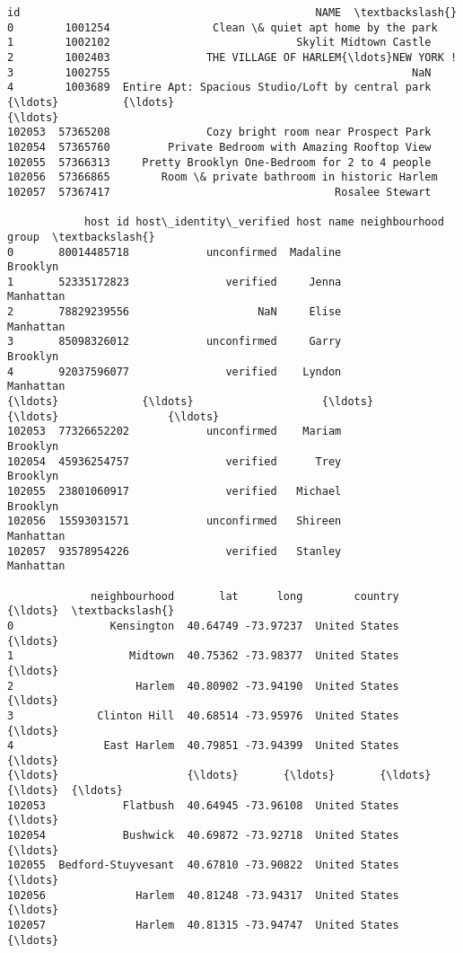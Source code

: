 \documentclass[11pt]{article}
\makeatletter
\newcommand{\boxspacing}{\kern\kvtcb@left@rule\kern\kvtcb@boxsep}
\newcommand{\prompt}[4]{
        {\ttfamily\llap{{\color{#2}[#3]:\hspace{3pt}#4}}\vspace{-\baselineskip}}
    }
\makeatother
\begin{document}
            \begin{tcolorbox}[breakable, size=fbox, boxrule=.5pt, pad at break*=1mm, opacityfill=0]
\prompt{Out}{outcolor}{ }{\boxspacing}
\begin{Verbatim}[commandchars=\\\{\}]
              id                                              NAME  \textbackslash{}
0        1001254                Clean \& quiet apt home by the park
1        1002102                             Skylit Midtown Castle
2        1002403               THE VILLAGE OF HARLEM{\ldots}NEW YORK !
3        1002755                                               NaN
4        1003689  Entire Apt: Spacious Studio/Loft by central park
{\ldots}          {\ldots}                                               {\ldots}
102053  57365208               Cozy bright room near Prospect Park
102054  57365760         Private Bedroom with Amazing Rooftop View
102055  57366313     Pretty Brooklyn One-Bedroom for 2 to 4 people
102056  57366865        Room \& private bathroom in historic Harlem
102057  57367417                                   Rosalee Stewart

            host id host\_identity\_verified host name neighbourhood group  \textbackslash{}
0       80014485718            unconfirmed  Madaline            Brooklyn
1       52335172823               verified     Jenna           Manhattan
2       78829239556                    NaN     Elise           Manhattan
3       85098326012            unconfirmed     Garry            Brooklyn
4       92037596077               verified    Lyndon           Manhattan
{\ldots}             {\ldots}                    {\ldots}       {\ldots}                 {\ldots}
102053  77326652202            unconfirmed    Mariam            Brooklyn
102054  45936254757               verified      Trey            Brooklyn
102055  23801060917               verified   Michael            Brooklyn
102056  15593031571            unconfirmed   Shireen           Manhattan
102057  93578954226               verified   Stanley           Manhattan

             neighbourhood       lat      long        country  {\ldots}  \textbackslash{}
0               Kensington  40.64749 -73.97237  United States  {\ldots}
1                  Midtown  40.75362 -73.98377  United States  {\ldots}
2                   Harlem  40.80902 -73.94190  United States  {\ldots}
3             Clinton Hill  40.68514 -73.95976  United States  {\ldots}
4              East Harlem  40.79851 -73.94399  United States  {\ldots}
{\ldots}                    {\ldots}       {\ldots}       {\ldots}            {\ldots}  {\ldots}
102053            Flatbush  40.64945 -73.96108  United States  {\ldots}
102054            Bushwick  40.69872 -73.92718  United States  {\ldots}
102055  Bedford-Stuyvesant  40.67810 -73.90822  United States  {\ldots}
102056              Harlem  40.81248 -73.94317  United States  {\ldots}
102057              Harlem  40.81315 -73.94747  United States  {\ldots}


\end{Verbatim}
\end{tcolorbox}
\end{document}
